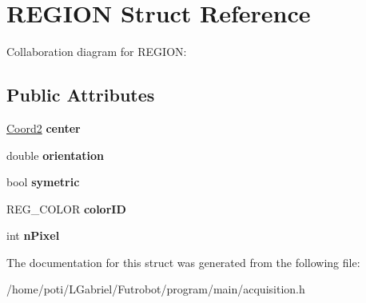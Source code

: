 \hypertarget{structREGION}{}\section{R\+E\+G\+I\+ON Struct Reference}
\label{structREGION}


Collaboration diagram for R\+E\+G\+I\+ON\+:
\subsection*{Public Attributes}
\begin{DoxyCompactItemize}
\item 
\hyperlink{structCoord2}{Coord2} {\bfseries center}\hypertarget{structREGION_a39e3b73c3d8d2083deaa0b4c77bfc050}{}\label{structREGION_a39e3b73c3d8d2083deaa0b4c77bfc050}

\item 
double {\bfseries orientation}\hypertarget{structREGION_ac34934ead078ab8856d7c3404c888238}{}\label{structREGION_ac34934ead078ab8856d7c3404c888238}

\item 
bool {\bfseries symetric}\hypertarget{structREGION_a730ffed48e38018df497dd24cea59302}{}\label{structREGION_a730ffed48e38018df497dd24cea59302}

\item 
R\+E\+G\+\_\+\+C\+O\+L\+OR {\bfseries color\+ID}\hypertarget{structREGION_a09d6880104f9fe93354ba673706c6501}{}\label{structREGION_a09d6880104f9fe93354ba673706c6501}

\item 
int {\bfseries n\+Pixel}\hypertarget{structREGION_a190372b3c7f2099be227f8e61d9b9ce8}{}\label{structREGION_a190372b3c7f2099be227f8e61d9b9ce8}

\end{DoxyCompactItemize}


The documentation for this struct was generated from the following file\+:\begin{DoxyCompactItemize}
\item 
/home/poti/\+L\+Gabriel/\+Futrobot/program/main/acquisition.\+h\end{DoxyCompactItemize}
